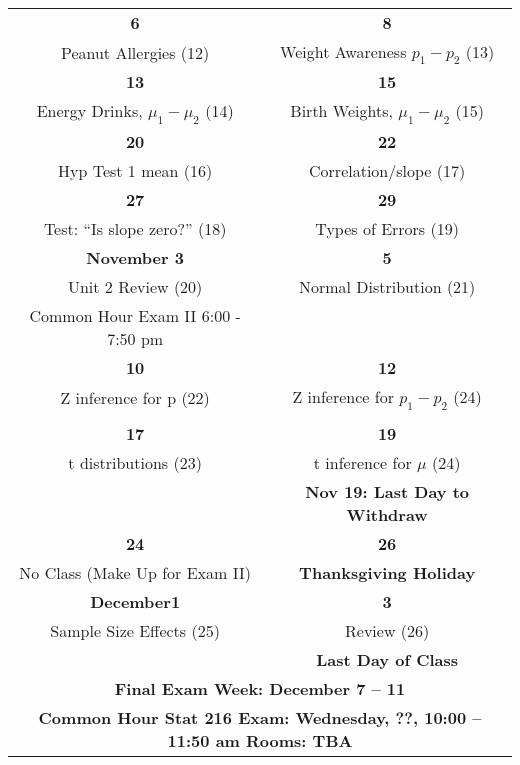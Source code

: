 \begin{center}
\begin{tabular}{|c|c|}
  \hfill\bf{6} & \hfill\bf{8} \\
 Peanut Allergies \small{(12)} &  
 Weight Awareness $p_1 - p_2$ \small{(13)}  \\ \hline

   \hfill\bf{13} & \hfill\bf{15} \\
 Energy Drinks, $\mu_1 - \mu_2$  \small{(14)}& 
 Birth Weights, $\mu_1 - \mu_2$ \small{(15)}  \\ 
\hline

 \hfill\bf{20}  & \hfill\bf{22} \\
Hyp Test 1 mean   \small{(16)}   &   
 Correlation/slope \small{(17)}\\ \hline

  \hfill\bf{27} & \hfill\bf{29} \\
  Test: ``Is slope zero?'' \small{(18)} &  
Types of Errors \small{(19)} %
 \\ \hline

   \bf{November} \hfill\bf{3} & \hfill\bf{5} \\
 Unit 2  Review   \small{(20)}&  
 Normal Distribution \small{(21)}  %
 \\
Common Hour Exam II 6:00 - 7:50 pm & \\
 \hline

   \hfill\bf{10} & \hfill\bf{12} \\
  Z inference for p   \small{(22)} 
 & Z inference for $p_1-p_2$  \small{(24)}

\\
   &  \\ \hline

   \hfill\bf{17}  &  \hfill\bf{19}  \\
  t distributions  \small{(23)}&
  t inference for $\mu$  \small{(24)}\\ 
  &
   \small\bf{Nov 19: Last Day to Withdraw} \\ \hline
 
 \hfill\bf{24} & \hfill\bf{26} \\
No Class (Make Up for Exam II)%
 & {\bf Thanksgiving Holiday} 
\\ \hline

  {\bf December}\hfill\bf{1} & \hfill\bf{3} \\
  Sample Size Effects \small{(25)}%
  & Review    \small{(26)}%
\\
  &  \small\bf{ Last Day of Class}  \\ \hline

  \multicolumn{2}{|c|}{\textbf{Final Exam Week: December 7 -- 11 }} \\
  \multicolumn{2}{|c|}{\bf{ Common Hour Stat 216  Exam: 
      Wednesday, ??, 10:00 -- 11:50 am Rooms: TBA}} \\
\hline

\end{tabular}
\vspace{.2in} \\
\end{center}
%  
